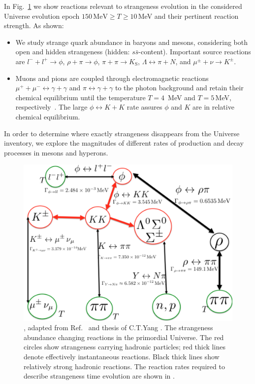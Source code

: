 In Fig.~\ref{Strangeness_map2} we show reactions relevant to strangeness evolution in the considered Universe evolution epoch $150\,\mathrm{MeV}\ge T\ge 10$\,MeV  and their pertinent reaction strength. As shown:
\begin{itemize}
\item
We study strange quark abundance in baryons and mesons, considering both open and hidden strangeness (hidden: $s\bar s$-content). Important source reactions are $l^-+l^+\rightarrow\phi$, $\rho+\pi\rightarrow\phi$, $\pi+\pi\rightarrow K_\mathrm{S}$, $\Lambda \leftrightarrow \pi+ N$, and $\mu^\pm+\nu\rightarrow K^\pm$. 
\item
Muons and pions are coupled through electromagnetic reactions $\mu^++\mu^-\leftrightarrow\gamma+\gamma$ and $\pi\leftrightarrow\gamma+\gamma$ to the photon background and retain their chemical equilibrium until the temperature $T =4$\, MeV and $T=5$\,MeV, respectively~\cite{Rafelski:2021aey,Kuznetsova:2008jt}. The large $\phi\leftrightarrow K+K$ rate assures $\phi$ and $K$ are in relative chemical equilibrium.
\end{itemize}
In order to determine where exactly strangeness disappears from the Universe inventory, we explore the magnitudes of different rates of production and decay processes in mesons and hyperons.
\begin{figure} %
\centering
\includegraphics[width=0.75\linewidth]{./plots/Strangeness002_newJ.jpg}
\caption{, adapted from Ref.~\cite{Yang:2021bko} and thesis of C.T.Yang \cite{Yang:2024ret}. The strangeness abundance changing reactions in the primordial Universe. The red circles show strangeness carrying hadronic particles; red thick lines denote effectively instantaneous reactions. Black thick lines show relatively strong hadronic reactions. The reaction rates required to describe  strangeness time evolution are shown in \cite{Rafelski:2020ajx}.
}
\label{Strangeness_map2}
\end{figure}



